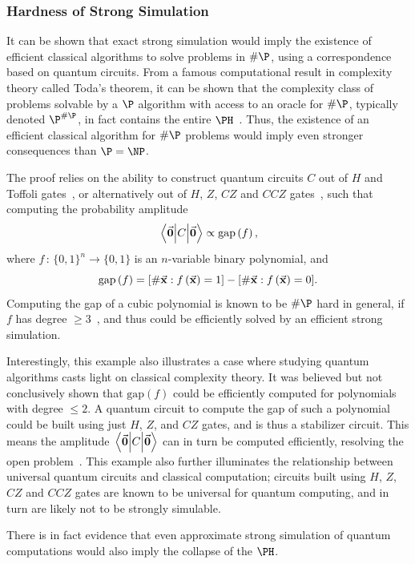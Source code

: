 \subsubsection{Hardness of Strong Simulation}
It can be shown that exact strong simulation would imply the existence of efficient classical algorithms to solve problems in $\#\P$, using a correspondence based on quantum circuits. From a famous computational result in complexity theory called Toda's theorem, it can be shown that the complexity class of problems solvable by a $\P$ algorithm with access to an oracle for $\#\P$, typically denoted $\P^{\#\P}$, in fact contains the entire $\PH$~\cite{Toda1991}. Thus, the existence of an efficient classical algorithm for $\#\P$ problems would imply even stronger consequences than $\P=\NP$.\par
The proof relies on the ability to construct quantum circuits $C$ out of $H$ and Toffoli gates~\cite{Dawson2004}, or alternatively out of $H$, $Z$, $CZ$ and $CCZ$ gates~\cite{Montanaro2017}, such that computing the probability amplitude 
\[\matrixel{\va{0}}{C}{\va{0}} \propto \text{gap}\left(f\right),\]
where $f\,:\,\{0,1\}^{n}\rightarrow \{0,1\}$ is an $n$-variable binary polynomial, and
\[\text{gap}\left(f\right) = [\# \va{x}:f\left(\va{x}\right)=1] - [\# \va{x}:f\left(\va{x}\right)=0].\]
Computing the gap of a cubic polynomial is known to be $\#\P$ hard in general, if $f$ has degree $\geq 3$~\cite{Montanaro2017}, and thus could be efficiently solved by an efficient strong simulation.\par
Interestingly, this example also illustrates a case where studying quantum algorithms casts light on classical complexity theory. It was believed but not conclusively shown that $\text{gap}\left(f\right)$ could be efficiently computed for polynomials with degree $\leq 2$. A quantum circuit to compute the gap of such a polynomial could be built using just $H$, $Z$, and $CZ$ gates, and is thus a stabilizer circuit. This means the amplitude $\matrixel{\va{0}}{C}{\va{0}}$ can in turn be computed efficiently, resolving the open problem~\cite{Montanaro2017}. This example also further illuminates the relationship between universal quantum circuits and classical computation; circuits built using $H$, $Z$, $CZ$ and $CCZ$ gates are known to be universal for quantum computing, and in turn are likely not to be strongly simulable.\par
There is in fact evidence that even approximate strong simulation of quantum computations would also imply the collapse of the $\PH$.
